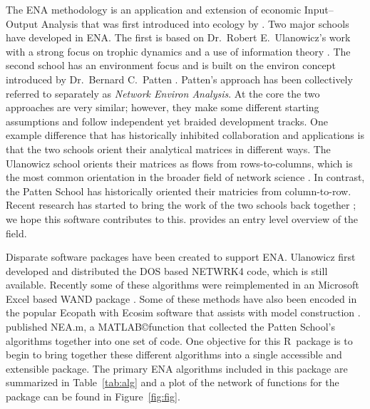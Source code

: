 \documentclass[11pt]{article}
\def\R{\textsf{R}}
\begin{document}
The ENA methodology is an application and extension of economic
Input--Output Analysis \citep{leontief1936,leontief66} that was first
introduced into ecology by \citet{hannon73}.  Two major schools have
developed in ENA.  The first is based on Dr.\ Robert E.\ Ulanowicz's
work with a strong focus on trophic dynamics and a use of information
theory \citep{ulanowicz86, ulanowicz97, ulanowicz04}.  The second
school has an environment focus and is built on the environ concept
introduced by Dr.\ Bernard C.\ Patten \citep{patten76, patten78,
  fath99_review}.  Patten's approach has been collectively referred to
separately as \emph{Network Environ Analysis}. At the core the two
approaches are very similar; however, they make some different
starting assumptions and follow independent yet braided development
tracks. One example difference that has historically inhibited
collaboration and applications is that the two schools orient their
analytical matrices in different ways.  The Ulanowicz school orients
their matrices as flows from rows-to-columns, which is the most common
orientation in the broader field of network science
\citep[e.g.,][]{brandes05}.  In contrast, the Patten School has
historically oriented their matricies from column-to-row.  Recent
research has started to bring the work of the two schools back
together \citep[e.g.,][]{scharler09comparing}; we hope this software
contributes to this.  \citet{borrett12_netecol} provides an entry
level overview of the field.

Disparate software packages have been created to support
ENA. Ulanowicz first developed and distributed the DOS based NETWRK4
code, which is still available.  Recently some of these algorithms were
reimplemented in an Microsoft Excel based WAND package
\citep{allesina04_wand}.  Some of these methods have also been encoded
in the popular Ecopath with Ecosim software that assists with model
construction \citep{christensen04}.  \citet{fath06} published NEA.m, a
MATLAB\copyright function that collected the Patten School's
algorithms together into one set of code.  One objective for this
\R\ package is to begin to bring together these different
algorithms into a single accessible and extensible package.  The
primary ENA algorithms included in this package are summarized in
Table~\ref{tab:alg} and a plot of the network of functions for the
package can be found in Figure~\ref{fig:fig}.
\end{document}

